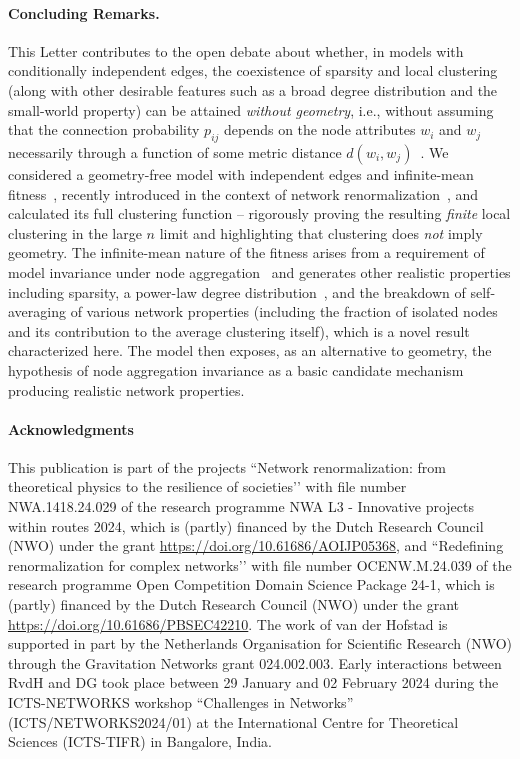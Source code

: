 \documentclass[ twocolumn,
 amsmath,amssymb,
 aps, pre, amsthm, amsfonts,
]{revtex4-2}
\begin{document}
\paragraph*{Concluding Remarks.}
This Letter contributes to the open debate about whether, in models with conditionally independent edges, the coexistence of sparsity and local clustering (along with other desirable features such as a broad degree distribution and the small-world property) can be attained \emph{without geometry}, i.e., without assuming that the connection probability $p_{ij}$ depends on the node attributes $w_i$ and $w_j$ necessarily through a function of some metric distance $d(w_i,w_j)$~\cite{krioukov2016clustering, aliakbarisani2025clustering, serrano2006clusteringI, serrano2006clusteringII, boguna2021network, newman2009random, krioukov2010hyperbolic, michielan2022detecting,allard2024geometric}.
We considered a geometry-free model with independent edges and infinite-mean fitness~\cite{garuccio2023multiscale, lalli2024geometry}, recently introduced in the context of network renormalization~\cite{gabrielli2025network}, and calculated its full clustering function -- rigorously proving the resulting \emph{finite} local clustering in the large $n$ limit and highlighting that clustering does \emph{not} imply geometry.
The infinite-mean nature of the fitness arises from a requirement of model invariance under node aggregation~\cite{garuccio2023multiscale} and
generates other realistic properties including sparsity, a power-law degree distribution~\cite{lalli2024geometry}, and the breakdown of self-averaging of various network properties (including the fraction of isolated nodes and its contribution to the average clustering itself), which is a novel result characterized here.
The model then exposes, as an alternative to geometry, the hypothesis of node aggregation invariance as a basic candidate mechanism producing realistic network properties.

\paragraph*{Acknowledgments}
This publication is part of the projects ``Network renormalization: from theoretical physics to the resilience of societies’’ with file number NWA.1418.24.029 of the research programme NWA L3 - Innovative projects within routes 2024, which is (partly) financed by the Dutch Research Council (NWO) under the grant \url{https://doi.org/10.61686/AOIJP05368}, and ``Redefining renormalization for complex networks’’ with file number OCENW.M.24.039 of the research programme Open Competition Domain Science Package 24-1, which is (partly) financed by the Dutch Research Council (NWO) under the grant \url{https://doi.org/10.61686/PBSEC42210}.
The work of van der Hofstad is supported in part by the Netherlands Organisation for Scientific Research (NWO) through the Gravitation {\sc Networks} grant 024.002.003.
Early interactions between RvdH and DG took place between 29 January and 02 February 2024 during the ICTS-NETWORKS workshop ``Challenges in Networks'' (ICTS/NETWORKS2024/01) at the International Centre for Theoretical Sciences (ICTS-TIFR) in Bangalore, India.
\end{document}
